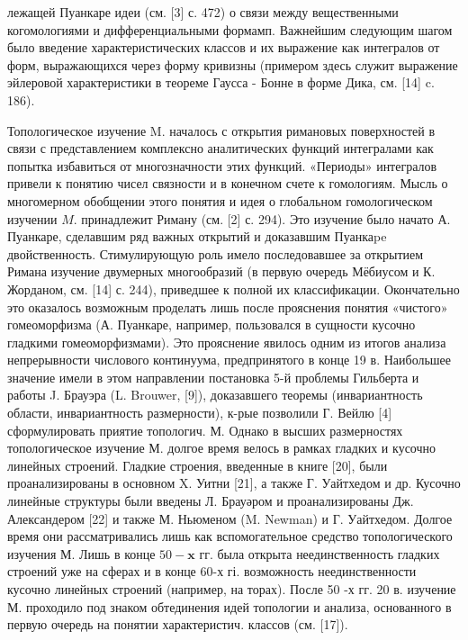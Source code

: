 \documentclass[10pt]{article}
\begin{document}
лежащей Пуанкаре идеи (см. [3] с. 472) о связи между вещественными когомологиями и дифференциальными формамп. Важнейшим следующим шагом было введение характеристических классов и их выражение как интегралов от форм, выражающихся через форму кривизны (примером здесь служит выражение эйлеровой характеристики в теореме Гаусса - Бонне в форме Дика, см. [14] c. 186).



Топологическое изучение M. началось с открытия римановых поверхностей в связи с представлением комплексно аналитических функций интегралами как попытка избавиться от многозначности этих функций. «Периоды» интегралов привели к понятию чисел связности и в конечном счете к гомологиям. Мысль о многомерном обобщении этого понятия и идея о глобальном гомологическом изучении $M$. принадлежит Риману (см. [2] с. 294). Это изучение было начато А. Пуанкаре, сделавшим ряд важных открытий и доказавшим Пуанкаpe двойственность. Стимулирующую роль имело последовавшее за открытием Римана изучение двумерных многообразий (в первую очередь Мёбиусом и К. Жорданом, см. [14] с. 244), приведшее к полной их классификации. Окончательно это оказалось возможным проделать лишь после прояснения понятия «чистого» гомеоморфизма (А. Пуанкаре, например, пользовался в сущности кусочно гладкими гомеоморфизмами). Это прояснение явилось одним из итогов анализа непрерывности числового континуума, предпринятого в конце 19 в. Наибольшее значение имели в этом направлении постановка 5-й проблемы Гильберта и работы J. Брауэра (L. Brouwer, [9]), доказавшего теоремы (инвариантность области, инвариантность размерности), к-рые позволили Г. Вейлю [4] сформулировать приятие топологич. М. Однако в высших размерностях топологическое изучение М. долгое время велось в рамках гладких и кусочно линейных строений. Гладкие строения, введенные в книге [20], были проанализированы в основном X. Уитни [21], а также Г. Уайтхедом и др. Кусочно линейные структуры были введены Л. Брауәром и проанализированы Дж. Александером [22] и также М. Ньюменом (M. Newman) и Г. Уайтхедом. Долгое время они рассматривались лишь как вспомогательное средство топологического изучения М. Лишь в конце $50-\mathbf{x}$ гг. была открыта неединственность гладких строений уже на сферах и в конце 60-х гі. возможность неединственности кусочно линейных строений (например, на торах). После 50 -х гг. 20 в. изучение М. проходило под знаком обтединения идей топологии и анализа, основанного в первую очередь на понятии характеристич. классов (см. [17]).
\end{document}
